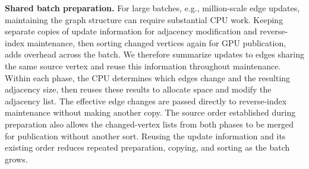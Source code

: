 \textbf{Shared batch preparation.} For large batches, e.g., million-scale edge updates, maintaining the graph structure can require substantial CPU work. Keeping separate copies of update information for adjacency modification and reverse-index maintenance, then sorting changed vertices again for GPU publication, adds overhead across the batch. We therefore summarize updates to edges sharing the same source vertex and reuse this information throughout maintenance. Within each phase, the CPU determines which edges change and the resulting adjacency size, then reuses these results to allocate space and modify the adjacency list. The effective edge changes are passed directly to reverse-index maintenance without making another copy. The source order established during preparation also allows the changed-vertex lists from both phases to be merged for publication without another sort. Reusing the update information and its existing order reduces repeated preparation, copying, and sorting as the batch grows.
